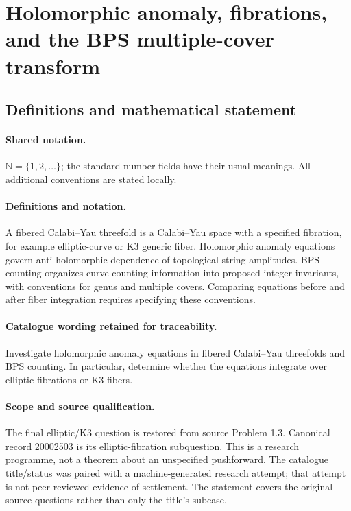 \documentclass[11pt]{article}
\begin{document}
\section{Holomorphic anomaly, fibrations, and the BPS multiple-cover transform}\label{statement}

\subsection{Definitions and mathematical statement}

\paragraph{Shared notation.}$\mathbb N=\{1,2,\ldots\}$; the standard number fields have their usual meanings. All additional conventions are stated locally.


\paragraph{Definitions and notation.}A fibered Calabi--Yau threefold is a Calabi--Yau space with a specified fibration, for example elliptic-curve or K3 generic fiber. Holomorphic anomaly equations govern anti-holomorphic dependence of topological-string amplitudes. BPS counting organizes curve-counting information into proposed integer invariants, with conventions for genus and multiple covers. Comparing equations before and after fiber integration requires specifying these conventions.

\paragraph{Catalogue wording retained for traceability.}
Investigate holomorphic anomaly equations in fibered Calabi--Yau threefolds and BPS counting. In particular, determine whether the equations integrate over elliptic fibrations or K3 fibers.
\paragraph{Scope and source qualification.}The final elliptic/K3 question is restored from source Problem 1.3. Canonical record 20002503 is its elliptic-fibration subquestion. This is a research programme, not a theorem about an unspecified pushforward. The catalogue title/status was paired with a machine-generated research attempt; that attempt is not peer-reviewed evidence of settlement. The statement covers the original source questions rather than only the title’s subcase.
\end{document}

